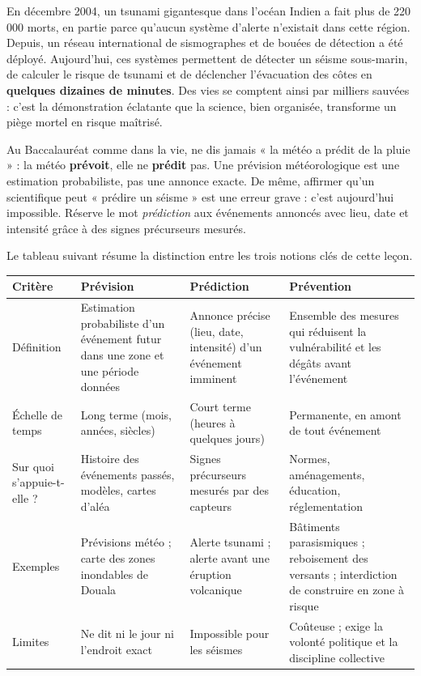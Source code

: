 \documentclass[11pt]{article}
\newcounter{popsec}
\newcounter{popsub}
\newcommand{\courssub}[1]{%
  \stepcounter{popsub}%
  \par\vspace{9pt}\noindent{\popxbold\fontsize{11.5}{13}\selectfont\color{popink}{\color{poporange}\thepopsec.\thepopsub}\hspace{6pt}#1}\par\nopagebreak\vspace{4pt}
}
\begin{document}
\begin{exemplebox}
En décembre 2004, un tsunami gigantesque dans l'océan Indien a fait plus de 220 000 morts, en partie parce qu'aucun système d'alerte n'existait dans cette région. Depuis, un réseau international de sismographes et de bouées de détection a été déployé. Aujourd'hui, ces systèmes permettent de détecter un séisme sous-marin, de calculer le risque de tsunami et de déclencher l'évacuation des côtes en \textbf{quelques dizaines de minutes}. Des vies se comptent ainsi par milliers sauvées : c'est la démonstration éclatante que la science, bien organisée, transforme un piège mortel en risque maîtrisé.
\end{exemplebox}

\courssub{Prévision ou prédiction ? Ne pas confondre}

\begin{attention}
Au Baccalauréat comme dans la vie, ne dis jamais « la météo a prédit de la pluie » : la météo \textbf{prévoit}, elle ne \textbf{prédit} pas. Une prévision météorologique est une estimation probabiliste, pas une annonce exacte. De même, affirmer qu'un scientifique peut « prédire un séisme » est une erreur grave : c'est aujourd'hui impossible. Réserve le mot \emph{prédiction} aux événements annoncés avec lieu, date et intensité grâce à des signes précurseurs mesurés.
\end{attention}

Le tableau suivant résume la distinction entre les trois notions clés de cette leçon.

\begin{center}
\begin{tabularx}{\linewidth}{|l|X|X|X|}
\hline
\rowcolor{popblueL} \textbf{Critère} & \textbf{Prévision} & \textbf{Prédiction} & \textbf{Prévention} \\
\hline
Définition & Estimation probabiliste d'un événement futur dans une zone et une période données & Annonce précise (lieu, date, intensité) d'un événement imminent & Ensemble des mesures qui réduisent la vulnérabilité et les dégâts avant l'événement \\
\hline
Échelle de temps & Long terme (mois, années, siècles) & Court terme (heures à quelques jours) & Permanente, en amont de tout événement \\
\hline
Sur quoi s'appuie-t-elle ? & Histoire des événements passés, modèles, cartes d'aléa & Signes précurseurs mesurés par des capteurs & Normes, aménagements, éducation, réglementation \\
\hline
Exemples & Prévisions météo ; carte des zones inondables de Douala & Alerte tsunami ; alerte avant une éruption volcanique & Bâtiments parasismiques ; reboisement des versants ; interdiction de construire en zone à risque \\
\hline
Limites & Ne dit ni le jour ni l'endroit exact & Impossible pour les séismes & Coûteuse ; exige la volonté politique et la discipline collective \\
\hline
\end{tabularx}
\end{center}
\end{document}
